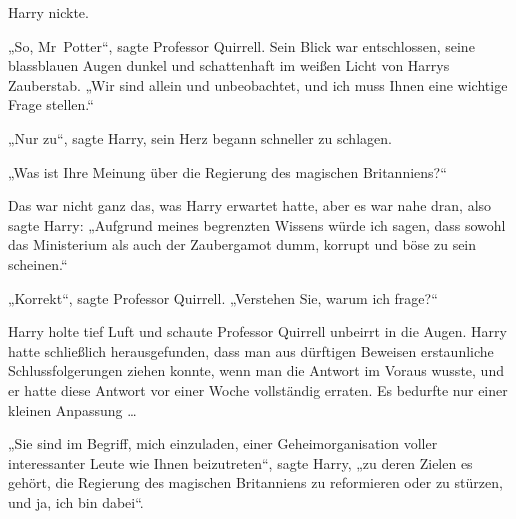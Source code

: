 Harry nickte.

„So, Mr~Potter“, sagte Professor Quirrell. Sein Blick war entschlossen, seine blassblauen Augen dunkel und schattenhaft im weißen Licht von Harrys Zauberstab.
„Wir sind allein und unbeobachtet, und ich muss Ihnen eine wichtige Frage stellen.“

„Nur zu“, sagte Harry, sein Herz begann schneller zu schlagen.

„Was ist Ihre Meinung über die Regierung des magischen Britanniens?“

Das war nicht ganz das, was Harry erwartet hatte, aber es war nahe dran, also sagte Harry:
„Aufgrund meines begrenzten Wissens würde ich sagen, dass sowohl das Ministerium als auch der Zaubergamot dumm, korrupt und böse zu sein scheinen.“

„Korrekt“, sagte Professor Quirrell.
„Verstehen Sie, warum ich frage?“

Harry holte tief Luft und schaute Professor Quirrell unbeirrt in die Augen. Harry hatte schließlich herausgefunden, dass man aus dürftigen Beweisen erstaunliche Schlussfolgerungen ziehen konnte, wenn man die Antwort im Voraus wusste, und er hatte diese Antwort vor einer Woche vollständig erraten. Es bedurfte nur einer kleinen Anpassung …

„Sie sind im Begriff, mich einzuladen, einer Geheimorganisation voller interessanter Leute wie Ihnen beizutreten“, sagte Harry, „zu deren Zielen es gehört, die Regierung des magischen Britanniens zu reformieren oder zu stürzen, und ja, ich bin dabei“.

